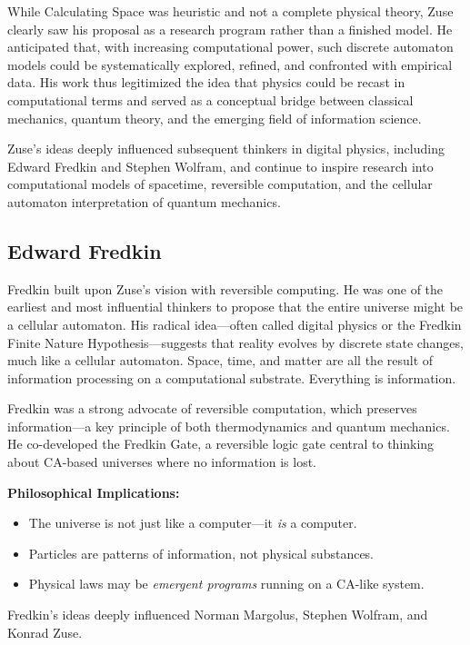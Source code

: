 \documentclass[12pt,english]{article}
\begin{document}
While Calculating Space was heuristic and not a complete physical theory, Zuse clearly saw his proposal as a research program rather than a finished model. He anticipated that, with increasing computational power, such discrete automaton models could be systematically explored, refined, and confronted with empirical data. His work thus legitimized the idea that physics could be recast in computational terms and served as a conceptual bridge between classical mechanics, quantum theory, and the emerging field of information science.

Zuse’s ideas deeply influenced subsequent thinkers in digital physics, including Edward Fredkin and Stephen Wolfram, and continue to inspire research into computational models of spacetime, reversible computation, and the cellular automaton interpretation of quantum mechanics.

\subsection*{Edward Fredkin}
Fredkin \cite{fredkin} built upon Zuse’s vision with reversible computing. He was one of the earliest and most influential thinkers to propose that the entire universe might be a cellular automaton. His radical idea—often called digital physics or the Fredkin Finite Nature Hypothesis—suggests that reality evolves by discrete state changes, much like a cellular automaton. Space, time, and matter are all the result of information processing on a computational substrate. Everything is information.

Fredkin was a strong advocate of reversible computation, which preserves information—a key principle of both thermodynamics and quantum mechanics. He co-developed the Fredkin Gate, a reversible logic gate central to thinking about CA-based universes where no information is lost.

\textbf{Philosophical Implications:}
\begin{itemize}
  \item The universe is not just like a computer—it \emph{is} a computer.
  \item Particles are patterns of information, not physical substances.
  \item Physical laws may be \emph{emergent programs} running on a CA-like system.
\end{itemize}

Fredkin’s ideas deeply influenced Norman Margolus, Stephen Wolfram, and Konrad Zuse.
\end{document}
